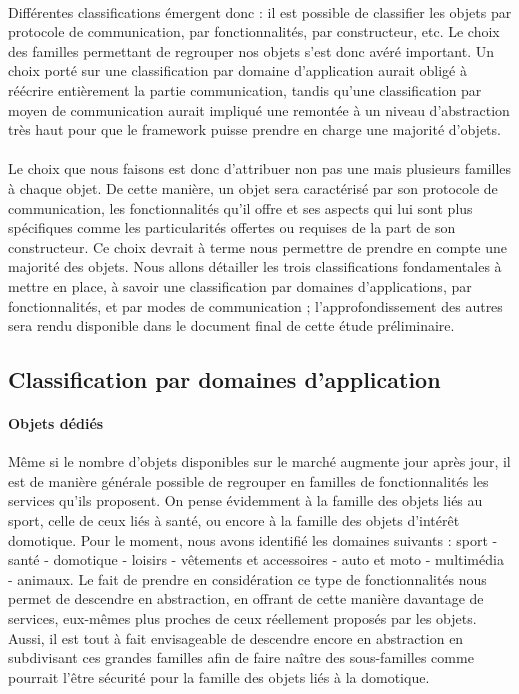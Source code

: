 \documentclass[nocopyrightspace]{sigplanconf}
\begin{document}
	\paragraph{}
	Différentes classifications émergent donc : il est possible de classifier les objets par protocole de communication, par fonctionnalités, par constructeur, etc. Le choix des familles permettant de regrouper nos objets s'est donc avéré important. Un choix porté sur une classification par domaine d'application aurait obligé à réécrire entièrement la partie communication, tandis qu'une classification par moyen de communication aurait impliqué une remontée à un niveau d'abstraction très haut pour que le framework puisse prendre en charge une majorité d'objets.

	\paragraph{}
	Le choix que nous faisons est donc d'attribuer non pas une mais plusieurs familles à chaque objet. De cette manière, un objet sera caractérisé par son protocole de communication, les fonctionnalités qu'il offre et ses aspects qui lui sont plus spécifiques comme les particularités offertes ou requises de la part de son constructeur. Ce choix devrait à terme nous permettre de prendre en compte une majorité des objets. Nous allons détailler les trois classifications fondamentales à mettre en place, à savoir une classification par domaines d'applications, par fonctionnalités, et par modes de communication ; l'approfondissement des autres sera rendu disponible dans le document final de cette étude préliminaire\cite{d2api}.

	\subsection{Classification par domaines d'application}
		\paragraph{Objets dédiés}
		Même si le nombre d'objets disponibles sur le marché augmente jour après jour, il est de manière générale possible de regrouper en familles de fonctionnalités les services qu'ils proposent. On pense évidemment à la famille des objets liés au sport, celle de ceux liés à santé, ou encore à la famille des objets d'intérêt domotique. Pour le moment, nous avons identifié les domaines suivants : sport - santé - domotique - loisirs - vêtements et accessoires - auto et moto - multimédia - animaux. Le fait de prendre en considération ce type de fonctionnalités nous permet de descendre en abstraction, en offrant de cette manière davantage de services, eux-mêmes plus proches de ceux réellement proposés par les objets. Aussi, il est tout à fait envisageable de descendre encore en abstraction en subdivisant ces grandes familles afin de faire naître des sous-familles comme pourrait l'être \og sécurité\fg{} pour la famille des objets liés à la domotique.
\end{document}
